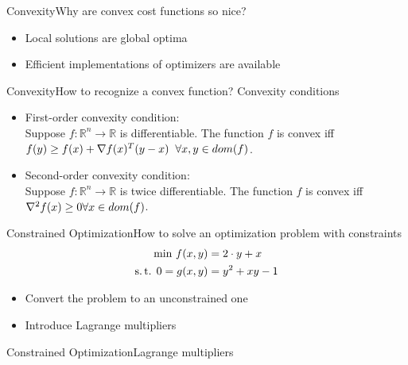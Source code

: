 \begin{frame}{Convexity}{Why are convex cost functions so nice?}
	\begin{itemize}
		\item Local solutions are global optima
		\item Efficient implementations of optimizers are available
	\end{itemize}
\end{frame}

\begin{frame}{Convexity}{How to recognize a convex function? Convexity conditions}
	\begin{itemize}
		\item First-order convexity condition:\\ Suppose $f : \mathbb{R}^n \rightarrow \mathbb{R}$ is differentiable. The function $f$ is convex iff $f(y) \ge f(x) + \nabla f(x)^T(y - x) \hspace{0.2cm}\forall x, y \in dom(f)$.
		\item Second-order convexity condition:\\ Suppose $f : \mathbb{R}^n \rightarrow \mathbb{R}$ is twice differentiable. The function $f$ is convex iff $\nabla^2 f(x) \ge 0 \vspace{0.2cm}\forall x \in dom(f)$.
	\end{itemize}
\end{frame}

\begin{frame}{Constrained Optimization}{How to solve an optimization problem with constraints}
	\begin{align*}
		\text{min } f(x,y) &= 2\cdot y + x\\
		\text{s.\,t. } 0 = g(x,y) &= y^2 +xy -1\\
	\end{align*}
	\begin{itemize}
		\item Convert the problem to an unconstrained one\\
		\item Introduce Lagrange multipliers
	\end{itemize}
\end{frame}

\begin{frame}{Constrained Optimization}{Lagrange multipliers}
\end{frame}

